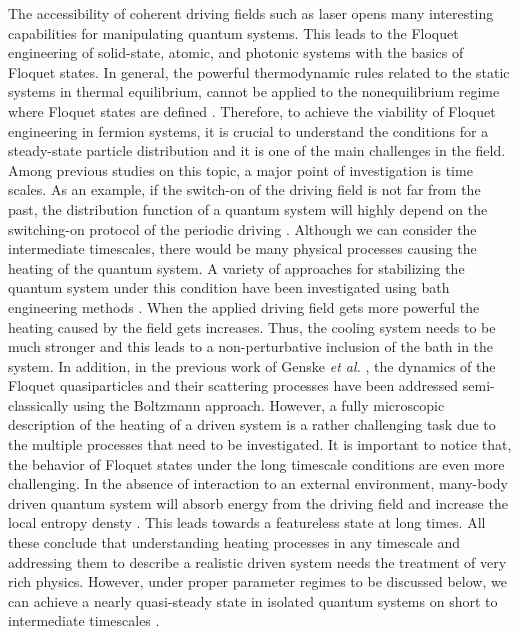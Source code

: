 \documentclass{article}
\begin{document}
The accessibility of coherent driving fields such as laser opens many interesting capabilities for manipulating quantum systems. This leads to the Floquet engineering of solid-state, atomic, and photonic systems with the basics of Floquet states. In general, the powerful thermodynamic rules related to the static systems in thermal equilibrium, cannot be applied to the nonequilibrium regime where Floquet states are defined \cite{seetharam2015}. Therefore, to achieve the viability of Floquet engineering in fermion systems, it is crucial to understand the conditions for a steady-state particle distribution and it is one of the main challenges in the field. Among previous studies on this topic, a major point of investigation is time scales. As an example, if the switch-on of the driving field is not far from the past, the distribution function of a quantum system will highly depend on the switching-on protocol of the periodic driving \cite{dehghani2014}. Although we can consider the intermediate timescales, there would be many physical processes causing the heating of the quantum system. A variety of approaches for stabilizing the quantum system under this condition have been investigated using bath engineering methods \cite{seetharam2015,weidinger2017,seetharam2019,rudner2020}. When the applied driving field gets more powerful the heating caused by the field gets increases. Thus, the cooling system needs to be much stronger and this leads to a non-perturbative inclusion of the bath in the system. In addition, in the previous work of Genske \textit{et al.} \cite{genske2015}, the dynamics of the Floquet quasiparticles and their scattering processes have been addressed semi-classically using the Boltzmann approach.
However, a fully microscopic description of the heating of a driven system is a rather challenging task due to the multiple processes that need to be investigated.
It is important to notice that, the behavior of Floquet states under the long timescale conditions are even more challenging. In the absence of interaction to an external environment, many-body driven quantum system will absorb energy from the driving field and increase the local entropy densty \cite{rudner2020}. This leads towards a featureless state at long times. All these conclude that understanding heating processes in any timescale and addressing them to describe a realistic driven system needs the treatment of very rich physics. However, under proper parameter regimes to be discussed below, we can achieve a nearly quasi-steady state in isolated quantum systems on short to intermediate timescales \cite{lindner2017,bukov2015,eckardt2015,kuwahara2016,abanin2017,mori2018,rudner2020}.
\end{document}

